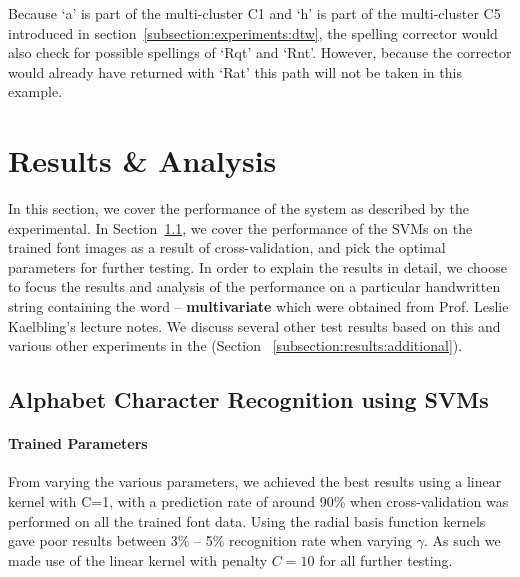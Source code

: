 \documentclass[12pt]{article}
\begin{document}
	Because `a' is part of the multi-cluster C1 and `h' is part of the multi-cluster C5 introduced in section~\ref{subsection:experiments:dtw}, the spelling corrector would also check for possible spellings of `Rqt' and `Rnt'. However, because the corrector would already have returned with `Rat' this path will not be taken in this example.	
	
\section{Results \& Analysis}
\label{section:results}
In this section, we cover the performance of the system as described by the experimental. In Section~\ref{subsubsection:analysis:svm}, we cover the performance of the SVMs on the trained font images as a result of cross-validation, and pick the optimal parameters for further testing. In order to explain the results in detail, we choose to focus the results and analysis of the performance on a particular handwritten string containing the word -- \textbf{multivariate} which were obtained from Prof. Leslie Kaelbling's lecture notes.  We discuss several other test results based on this and various other experiments in the (Section ~\ref{subsection:results:additional}).
	
	\subsection{Alphabet Character Recognition using SVMs}
	\label{subsubsection:analysis:svm}
	
	\paragraph{Trained Parameters}
	From varying the various parameters, we achieved the best results using a linear kernel with C=1, with a prediction rate of around 90\% when cross-validation was performed on all the trained font data. Using the radial basis function kernels gave poor results between 3\% -- 5\% recognition rate when varying $\gamma$. As such we made use of the linear kernel with penalty $C=10$ for all further testing.
	
\end{document}
